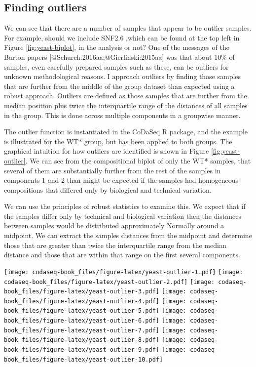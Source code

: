 \documentclass[
  onecolumn]{article}
\begin{document}
\hypertarget{finding-outliers}{%
\subsection{Finding outliers}\label{finding-outliers}}

We can see that there are a number of samples that appear to be outlier samples. For example, should we include SNF2.6 ,which can be found at the top left in Figure \ref{fig:yeast-biplot}, in the analysis or not? One of the messages of the Barton papers {[}@Schurch:2016aa;@Gierlinski:2015aa{]} was that about 10\% of samples, even carefully prepared samples such as these, can be outliers for unknown methodological reasons. I approach outliers by finding those samples that are further from the middle of the group dataset than expected using a robust approach. Outliers are defined as those samples that are further from the median position plus twice the interquartile range of the distances of all samples in the group. This is done across multiple components in a groupwise manner.

The outlier function is instantiated in the CoDaSeq R package, and the example is illustrated for the WT* group, but has been applied to both groups. The graphical intuition for how outliers are identified is shown in Figure \ref{fig:yeast-outlier}. We can see from the compositional biplot of only the WT* samples, that several of them are substantially further from the rest of the samples in components 1 and 2 than might be expected if the samples had homogeneous compositions that differed only by biological and technical variation.

We can use the principles of robust statistics to examine this. We expect that if the samples differ only by technical and biological variation then the distances between samples would be distributed approximately Normally around a midpoint. We can extract the samples distances from the midpoint and determine those that are greater than twice the interquartile range from the median distance and those that are within that range on the first several components.

\texttt{[image: codaseq-book\_files/figure-latex/yeast-outlier-1.pdf]} \texttt{[image: codaseq-book\_files/figure-latex/yeast-outlier-2.pdf]} \texttt{[image: codaseq-book\_files/figure-latex/yeast-outlier-3.pdf]} \texttt{[image: codaseq-book\_files/figure-latex/yeast-outlier-4.pdf]} \texttt{[image: codaseq-book\_files/figure-latex/yeast-outlier-5.pdf]} \texttt{[image: codaseq-book\_files/figure-latex/yeast-outlier-6.pdf]} \texttt{[image: codaseq-book\_files/figure-latex/yeast-outlier-7.pdf]} \texttt{[image: codaseq-book\_files/figure-latex/yeast-outlier-8.pdf]} \texttt{[image: codaseq-book\_files/figure-latex/yeast-outlier-9.pdf]} \texttt{[image: codaseq-book\_files/figure-latex/yeast-outlier-10.pdf]}
\end{document}
